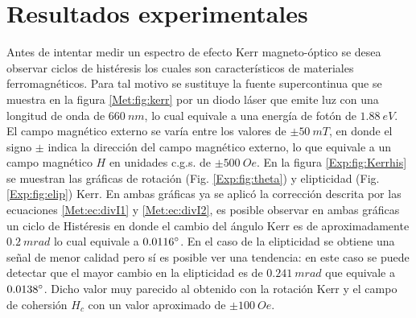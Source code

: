 \documentclass[paper=letter, fontsize=12pt]{scrartcl}
\numberwithin{equation}{section}		%
\numberwithin{figure}{section}			%
\numberwithin{table}{section}				%
\begin{document}
\section{Resultados experimentales}
Antes de intentar medir un espectro de efecto Kerr magneto-\'optico se desea observar ciclos de hist\'eresis los cuales son caracter\'isticos de materiales ferromagn\'eticos. Para tal motivo se sustituye la fuente supercontinua que se muestra en la figura \ref{Met:fig:kerr} por un diodo l\'aser que emite luz con una longitud de onda de $660~nm$, lo cual equivale a una energ\'ia de fot\'on de $1.88~eV $. El campo magn\'etico externo se var\'ia entre los valores de $\pm 50~mT$, en donde el signo $\pm$ indica la direcci\'on del campo magn\'etico externo, lo que equivale a  un campo magn\'etico $H$ en unidades c.g.s. de $\pm 500~ Oe$. En la figura \ref{Exp:fig:Kerrhis} se muestran las gr\'aficas de rotaci\'on (Fig. \ref{Exp:fig:theta}) y  elipticidad (Fig. \ref{Exp:fig:elip}) Kerr. En ambas gr\'aficas ya se aplic\'o la correcci\'on descrita por las ecuaciones \ref{Met:ec:divI1} y \ref{Met:ec:divI2}, es posible observar en ambas gr\'aficas un ciclo de Hist\'eresis en donde el cambio del \'angulo Kerr es de aproximadamente $0.2 ~mrad$ lo cual equivale a $0.0116 \degree$. En el caso de la elipticidad se obtiene una se\~nal de menor calidad pero s\'i es posible ver una tendencia: en este caso se puede detectar que el mayor cambio en la elipticidad es de $0.241~mrad$ que equivale a $0.0138 \degree$. Dicho valor muy parecido al obtenido con la rotaci\'on Kerr y  el campo de cohersi\'on $H_c$ con un valor aproximado de $\pm 100 ~Oe$.
\end{document}
